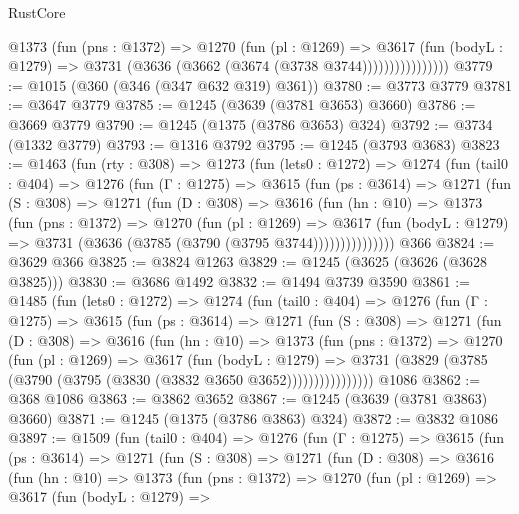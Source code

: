 \begin{lexlean}{RustCore}
\begin{coremodule}
                    @1373
                      (fun (pns : @1372) =>
                      @1270
                        (fun (pl : @1269) =>
                        @3617
                          (fun (bodyL : @1279) =>
                          @3731 (@3636 (@3662 (@3674 (@3738 @3744))))))))))))))))
@3779 := @1015 (@360 (@346 (@347 @632 @319) @361))
@3780 := @3773 @3779
@3781 := @3647 @3779
@3785 := @1245 (@3639 (@3781 @3653) @3660)
@3786 := @3669 @3779
@3790 := @1245 (@1375 (@3786 @3653) @324)
@3792 := @3734 (@1332 @3779)
@3793 := @1316 @3792
@3795 := @1245 (@3793 @3683)
@3823 := @1463
    (fun (rty : @308) =>
    @1273
      (fun (lets0 : @1272) =>
      @1274
        (fun (tail0 : @404) =>
        @1276
          (fun (Γ : @1275) =>
          @3615
            (fun (ps : @3614) =>
            @1271
              (fun (S : @308) =>
              @1271
                (fun (D : @308) =>
                @3616
                  (fun (hn : @10) =>
                  @1373
                    (fun (pns : @1372) =>
                    @1270
                      (fun (pl : @1269) =>
                      @3617
                        (fun (bodyL : @1279) =>
                        @3731 (@3636 (@3785 (@3790 (@3795 @3744)))))))))))))))
    @366
@3824 := @3629 @366
@3825 := @3824 @1263
@3829 := @1245 (@3625 (@3626 (@3628 @3825)))
@3830 := @3686 @1492
@3832 := @1494 @3739 @3590
@3861 := @1485
    (fun (lets0 : @1272) =>
    @1274
      (fun (tail0 : @404) =>
      @1276
        (fun (Γ : @1275) =>
        @3615
          (fun (ps : @3614) =>
          @1271
            (fun (S : @308) =>
            @1271
              (fun (D : @308) =>
              @3616
                (fun (hn : @10) =>
                @1373
                  (fun (pns : @1372) =>
                  @1270
                    (fun (pl : @1269) =>
                    @3617
                      (fun (bodyL : @1279) =>
                      @3731 (@3829 (@3785 (@3790 (@3795 (@3830 (@3832 @3650 @3652))))))))))))))))
    @1086
@3862 := @368 @1086
@3863 := @3862 @3652
@3867 := @1245 (@3639 (@3781 @3863) @3660)
@3871 := @1245 (@1375 (@3786 @3863) @324)
@3872 := @3832 @1086
@3897 := @1509
    (fun (tail0 : @404) =>
    @1276
      (fun (Γ : @1275) =>
      @3615
        (fun (ps : @3614) =>
        @1271
          (fun (S : @308) =>
          @1271
            (fun (D : @308) =>
            @3616
              (fun (hn : @10) =>
              @1373
                (fun (pns : @1372) =>
                @1270
                  (fun (pl : @1269) =>
                  @3617
                    (fun (bodyL : @1279) =>

\end{coremodule}
\end{lexlean}
